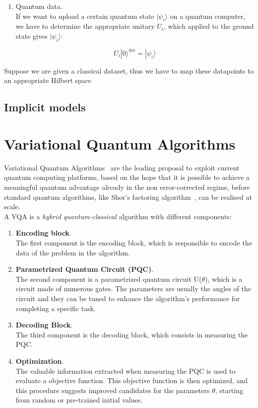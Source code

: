 \begin{enumerate}
    \item Quantum data.\\
    If we want to upload a certain quantum state $|\psi_i\rangle$ on a quantum computer, we have to determine
    the appropriate unitary $U_i$, which applied to the ground state gives $|\psi_i\rangle$:
    
    \begin{equation}
        U_i |0\rangle^{\otimes n} = |\psi_i\rangle
    \end{equation}
\end{enumerate}

Suppose we are given a classical dataset, thus we have to map these datapoints to an appropriate Hilbert space

\subsection{Implicit models}


\section{Variational Quantum Algorithms}

Variational Quantum Algorithms~\cite{Cerezo_2021} are the leading proposal to exploit current quantum computing platforms, 
based on the hope that it is possible to achieve a meaningful quantum advantage already in the non error-corrected 
regime, before standard quantum algorithms, like Shor’s factoring algorithm~\cite{Shor_1997}, can be realised at scale.\\ 

A VQA is a \textit{hybrid quantum-classical} algorithm with different components:

\begin{enumerate}
    \item \textbf{Encoding block}.\\
    The first component is the encoding block, which is responsible to encode the data of the problem in the 
    algorithm.
    \item \textbf{Parametrized Quantum Circuit (PQC)}.\\
    The second component is a parametrized quantum circuit U($\theta$), which is a circuit made of numerous gates. The parameters are usually 
    the angles of the circuit and they can be tuned to enhance the algorithm's performance for completing a specific task. 
    \item \textbf{Decoding Block}.\\
    The third component is the decoding block, which consists in measuring the PQC.
    \item \textbf{Optimization}.\\
    The valuable information extracted when measuring the PQC is used to evaluate a objective function.
    This objective function is then optimized, and this procedure suggests improved candidates 
    for the parameters $\theta$, starting from random or pre-trained initial values.
\end{enumerate}

